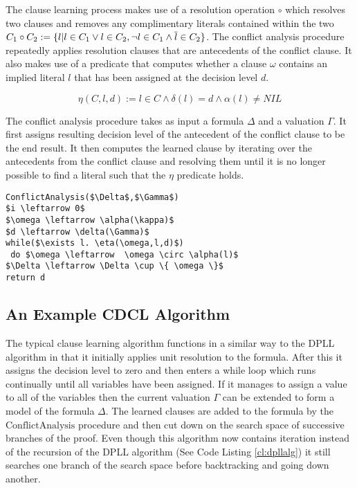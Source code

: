 The clause learning process makes use of a resolution operation $\circ$ which resolves two clauses and removes any complimentary literals contained within the two $C_1 \circ C_2 := \{l | l \in C_1 \vee l \in C_2, \neg l \in C_1 \wedge \overline{l} \in C_2 \}$. The conflict analysis procedure repeatedly applies resolution clauses that are antecedents of the conflict clause. It also makes use of a predicate that computes whether a clause $\omega$ contains an implied literal $l$ that has been assigned at the decision level $d$.

$$\eta(C,l,d) := l \in C \wedge \delta(l) = d \wedge \alpha(l) \neq NIL$$

The conflict analysis procedure takes as input a formula $\Delta$ and a valuation $\Gamma$. It first assigns resulting decision level of the antecedent of the conflict clause to be the end result. It then computes the learned clause by iterating over the antecedents from the conflict clause and resolving them until it is no longer possible to find a literal such that the $\eta$ predicate holds.

\begin{lstlisting}[caption = Conflict Analysis Procedure, mathescape]
ConflictAnalysis($\Delta$,$\Gamma$) 
$i \leftarrow 0$
$\omega \leftarrow \alpha(\kappa)$
$d \leftarrow \delta(\Gamma)$
while($\exists l. \eta(\omega,l,d)$)
 do $\omega \leftarrow  \omega \circ \alpha(l)$
$\Delta \leftarrow \Delta \cup \{ \omega \}$
return d
\end{lstlisting}



\subsection*{An Example CDCL Algorithm}

The typical clause learning algorithm functions in a similar way to the DPLL algorithm in that it initially applies unit resolution to the formula. After this it assigns the decision level to zero and then enters a while loop which runs continually until all variables have been assigned. If it manages to assign a value to all of the variables then the current valuation $\Gamma$ can be extended to form a model of the formula $\Delta$. The learned clauses are added to the formula by the $\mathrm{ConflictAnalysis}$ procedure and then cut down on the search space of successive branches of the proof. Even though this algorithm now contains iteration instead of the recursion of the DPLL algorithm (See Code Listing \ref{cl:dpllalg})  it still searches one branch of the search space before backtracking and going down another.




